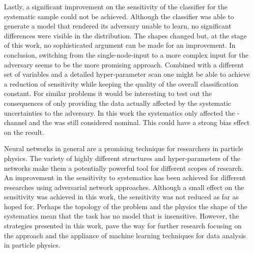 Lastly, a significant improvement on the sensitivity of the classifier for the systematic sample could not be achieved. Although the classifier was able to generate a model that rendered its adversary unable to learn, no significant differences were visible in the distribution. The shapes changed but, at the stage of this work, no sophisticated argument can be made for an improvement. In conclusion, switching from the single-node-input to a more complex input for the adversary seems to be the more promising approach. Combined with a different set of variables and a detailed hyper-parameter scan one might be able to achieve a reduction of sensitivity while keeping the quality of the overall classification constant.
For similar problems it would be interesting to test out the consequences of only providing the data actually affected by the systematic uncertainties to the adversary. In this work the systematics only affected the \tW-channel and the \ttbar was still considered nominal. This could have a strong bias effect on the result.

Neural networks in general are a promising technique for researchers in particle physics. The variety of highly different structures and hyper-parameters of the networks make them a potentially powerful tool for different scopes of research. An improvement in the sensitivity to systematics has been achieved for different researches using adversarial network approaches. Although a small effect on the sensitivity was achieved in this work, the sensitivity was not reduced as far as hoped for. Perhaps the topology of the problem and the physics the shape of the systematics mean that the task has no model that is insensitive. However, the strategies presented in this work, pave the way for further research focusing on the approach and the appliance of machine learning techniques for data analysis in particle physics.

